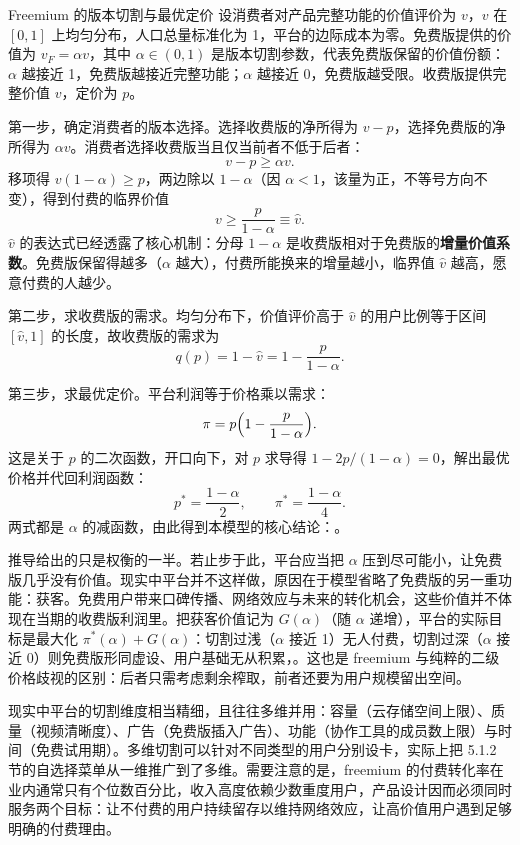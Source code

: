 \begin{derivation}{Freemium 的版本切割与最优定价}{}
设消费者对产品完整功能的价值评价为 $v$，$v$ 在 $[0,1]$ 上均匀分布，人口总量标准化为 1，平台的边际成本为零。免费版提供的价值为 $v_F = \alpha v$，其中 $\alpha \in (0,1)$ 是版本切割参数，代表免费版保留的价值份额：$\alpha$ 越接近 1，免费版越接近完整功能；$\alpha$ 越接近 0，免费版越受限。收费版提供完整价值 $v$，定价为 $p$。

第一步，确定消费者的版本选择。选择收费版的净所得为 $v - p$，选择免费版的净所得为 $\alpha v$。消费者选择收费版当且仅当前者不低于后者：
\[
v - p \geq \alpha v.
\]
移项得 $v(1-\alpha) \geq p$，两边除以 $1-\alpha$（因 $\alpha<1$，该量为正，不等号方向不变），得到付费的临界价值
\[
v \geq \frac{p}{1-\alpha} \equiv \hat v.
\]
$\hat v$ 的表达式已经透露了核心机制：分母 $1-\alpha$ 是收费版相对于免费版的\textbf{增量价值系数}。免费版保留得越多（$\alpha$ 越大），付费所能换来的增量越小，临界值 $\hat v$ 越高，愿意付费的人越少。

第二步，求收费版的需求。均匀分布下，价值评价高于 $\hat v$ 的用户比例等于区间 $[\hat v, 1]$ 的长度，故收费版的需求为
\[
q(p) = 1 - \hat v = 1 - \frac{p}{1-\alpha}.
\]

第三步，求最优定价。平台利润等于价格乘以需求：
\[
\pi = p\Bigl(1 - \frac{p}{1-\alpha}\Bigr).
\]
这是关于 $p$ 的二次函数，开口向下，对 $p$ 求导得 $1 - 2p/(1-\alpha) = 0$，解出最优价格并代回利润函数：
\[
p^* = \frac{1-\alpha}{2}, \qquad \pi^* = \frac{1-\alpha}{4}.
\]
两式都是 $\alpha$ 的减函数，由此得到本模型的核心结论：。
\end{derivation}

推导给出的只是权衡的一半。若止步于此，平台应当把 $\alpha$ 压到尽可能小，让免费版几乎没有价值。现实中平台并不这样做，原因在于模型省略了免费版的另一重功能：获客。免费用户带来口碑传播、网络效应与未来的转化机会，这些价值并不体现在当期的收费版利润里。把获客价值记为 $G(\alpha)$（随 $\alpha$ 递增），平台的实际目标是最大化 $\pi^*(\alpha) + G(\alpha)$：切割过浅（$\alpha$ 接近 1）无人付费，切割过深（$\alpha$ 接近 0）则免费版形同虚设、用户基础无从积累，。这也是 freemium 与纯粹的二级价格歧视的区别：后者只需考虑剩余榨取，前者还要为用户规模留出空间。

现实中平台的切割维度相当精细，且往往多维并用：容量（云存储空间上限）、质量（视频清晰度）、广告（免费版插入广告）、功能（协作工具的成员数上限）与时间（免费试用期）。多维切割可以针对不同类型的用户分别设卡，实际上把 5.1.2 节的自选择菜单从一维推广到了多维。需要注意的是，freemium 的付费转化率在业内通常只有个位数百分比，收入高度依赖少数重度用户，产品设计因而必须同时服务两个目标：让不付费的用户持续留存以维持网络效应，让高价值用户遇到足够明确的付费理由。

